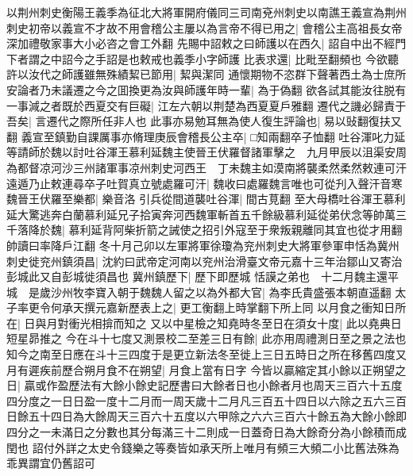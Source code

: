 以荆州刺史衡陽王義季為征北大將軍開府儀同三司南兗州刺史以南譙王義宣為荆州刺史初帝以義宣不才故不用會稽公主屢以為言帝不得已用之|{
	會稽公主高祖長女帝深加禮敬家事大小必咨之會工外翻}
先賜中詔敕之曰師護以在西久|{
	詔自中出不經門下者謂之中詔今之手詔是也敕戒也義季小字師護}
比表求還|{
	比毗至翻頻也}
今欲聽許以汝代之師護雖無殊績絜已節用|{
	絜與潔同}
通懷期物不恣群下聲著西土為士庶所安論者乃未議遷之今之囬換更為汝與師護年時一輩|{
	為于偽翻}
欲各試其能汝往脱有一事減之者既於西夏交有巨礙|{
	江左六朝以荆楚為西夏夏戶雅翻}
遷代之譏必歸責于吾矣|{
	言遷代之際所任非人也}
此事亦易勉耳無為使人復生評論也|{
	易以䜴翻復扶又翻}
義宣至鎮勤自課厲事亦脩理庚辰會稽長公主卒|{
	□知兩翻卒子恤翻}
吐谷渾叱力延等請師於魏以討吐谷渾王慕利延魏主使晉王伏羅督諸軍擊之　九月甲辰以沮渠安周為都督凉河沙三州諸軍事凉州刺史河西王　丁未魏主如漠南將襲柔然柔然敕連可汗遠遁乃止敕連尋卒子吐賀真立號處羅可汗|{
	魏收曰處羅魏言唯也可從刋入聲汗音寒}
魏晉王伏羅至樂都|{
	樂音洛}
引兵從間道襲吐谷渾|{
	間古莧翻}
至大母橋吐谷渾王慕利延大驚逃奔白蘭慕利延兄子拾寅奔河西魏軍斬首五千餘級慕利延從弟伏念等帥萬三千落降於魏|{
	慕利延背阿柴折箭之誡使之招引外寇至于衆叛親離同其宜也從才用翻帥讀曰率降戶江翻}
冬十月己卯以左軍將軍徐瓊為兖州刺史大將軍參軍申恬為冀州刺史徙兖州鎮須昌|{
	沈約曰武帝定河南以兖州治滑臺文帝元嘉十三年治鄒山又寄治彭城此又自彭城徙須昌也}
冀州鎮歷下|{
	歷下即歷城}
恬謨之弟也　十二月魏主還平城　是歲沙州牧李寶入朝于魏魏人留之以為外都大官|{
	為李氏貴盛張本朝直遥翻}
太子率更令何承天撰元嘉新歷表上之|{
	更工衡翻上時掌翻下所上同}
以月食之衝知日所在|{
	日與月對衝光相揜而知之}
又以中星檢之知堯時冬至日在須女十度|{
	此以堯典日短星昴推之}
今在斗十七度又測景校二至差三日有餘|{
	此亦用周禮測日至之景之法也}
知今之南至日應在斗十三四度于是更立新法冬至徙上三日五時日之所在移舊四度又月有遲疾前歷合朔月食不在朔望|{
	月食上當有日字}
今皆以贏縮定其小餘以正朔望之日|{
	贏或作盈歷法有大餘小餘史記歷書曰大餘者日也小餘者月也周天三百六十五度四分度之一日日盈一度十二月而一周天歲十二月凡三百五十四日以六除之五六三百日餘五十四日為大餘周天三百六十五度以六甲除之六六三百六十餘五為大餘小餘即四分之一未滿日之分數也其分每滿三十二則成一日蓋奇日為大餘奇分為小餘積而成閏也}
詔付外詳之太史令錢樂之等奏皆如承天所上唯月有頻三大頻二小比舊法殊為乖異謂宜仍舊詔可

